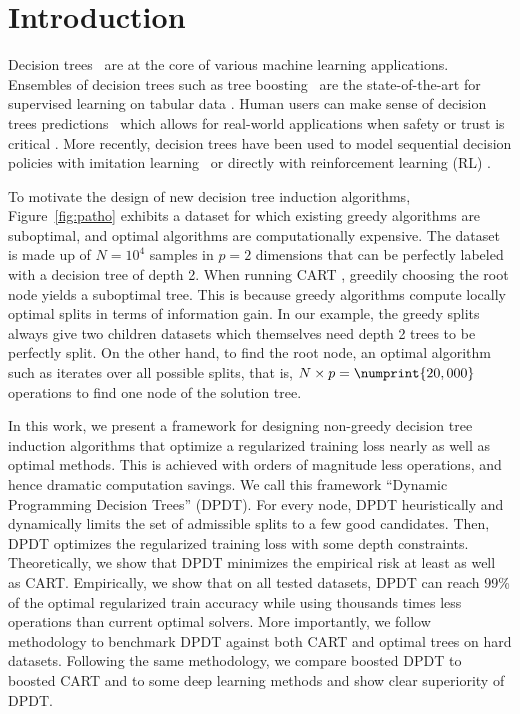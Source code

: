 \section{Introduction}
Decision trees~\cite{ID3,c45,breiman1984classification} are at the core of various machine learning applications. 
Ensembles of decision trees such as tree boosting~\cite{stcohFriedman,FriedmanBoosting,xgb,10.5555/3327757.3327770} are the state-of-the-art for supervised learning on tabular data \cite{grinsztajn2022tree}.
Human users can make sense of decision trees predictions~\cite{rigourous,lipton,pmlr-v247-bressan24a} which allows for real-world applications when safety or trust is critical \cite{saux:hal-04192198}. 
More recently, decision trees have been used to model sequential decision policies with imitation learning~\cite{viper,kohler2024interpretable} or directly with reinforcement learning (RL) \cite{topin2021iterative,vos2024optimizinginterpretabledecisiontree,mdpdt,marton2024sympolsymbolictreebasedonpolicy}.

To motivate the design of new decision tree induction algorithms, Figure~\ref{fig:patho} exhibits a dataset for which existing greedy algorithms are suboptimal, and optimal algorithms are computationally expensive. 
The dataset is made up of $N=10^4$ samples in $p=2$ dimensions that can be perfectly labeled with a decision tree of depth 2. When running CART \cite{breiman1984classification}, greedily choosing the root node yields a suboptimal tree.
This is because greedy algorithms compute locally optimal splits in terms of information gain. In our example, the greedy splits always give two children datasets which themselves need depth 2 trees to be perfectly split.
On the other hand, to find the root node, an optimal algorithm such as \cite{quantbnb} iterates over all possible splits, that is, $N\times p=\numprint{20,000}$ operations to find one node of the solution tree.

In this work, we present a framework for designing non-greedy decision tree induction algorithms that optimize a regularized training loss nearly as well as optimal methods. This is achieved with orders of magnitude less operations, and hence dramatic computation savings.
We call this framework ``Dynamic Programming Decision Trees'' (DPDT). For every node, DPDT heuristically and dynamically limits the set of admissible splits to a few good candidates. Then, DPDT optimizes the regularized training loss with some depth constraints.
Theoretically, we show that DPDT minimizes the empirical risk at least as well as CART\@.
Empirically, we show that on all tested datasets, DPDT can reach 99\% of the optimal regularized train accuracy while using thousands times less operations than current optimal solvers. 
More importantly, we follow \cite{grinsztajn2022tree} methodology to benchmark DPDT against both CART and optimal trees on hard datasets. Following the same methodology, we compare boosted DPDT \cite{FREUND1997119} to boosted CART and to some deep learning methods and show clear superiority of DPDT.

